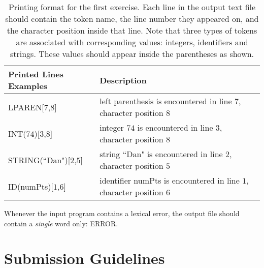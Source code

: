 \documentclass{article}
\begin{document}
\begin{table}[h]
\centering
\begin{tabular}{|l|l| }
Printed Lines Examples & Description \\
\hline
\hline
LPAREN[$7$,$8$] & left parenthesis is encountered in line $7$, character position $8$ \\
\hline
INT($74$)[$3$,$8$] & integer $74$ is encountered in line $3$, character position $8$ \\
\hline
STRING(``Dan")[$2$,$5$] & string ``Dan" is encountered in line $2$, character position $5$ \\
\hline
ID(numPts)[$1$,$6$] & identifier numPts is encountered in line $1$, character position $6$ \\
\hline
\end{tabular}
\caption{
Printing format for the first exercise.
Each line in the output text file should contain the token name,
the line number they appeared on, and the character position inside that line.
Note that three types of tokens are associated with corresponding values:
integers, identifiers and strings.
These values should appear inside the parentheses as shown.
\label{Table_Token_Printing_Examples_For_Exercise_1}}
\end{table}
Whenever the input program contains a lexical error, the output file
should contain a \textit{single} word only: ERROR.
\section{Submission Guidelines}
\end{document}
